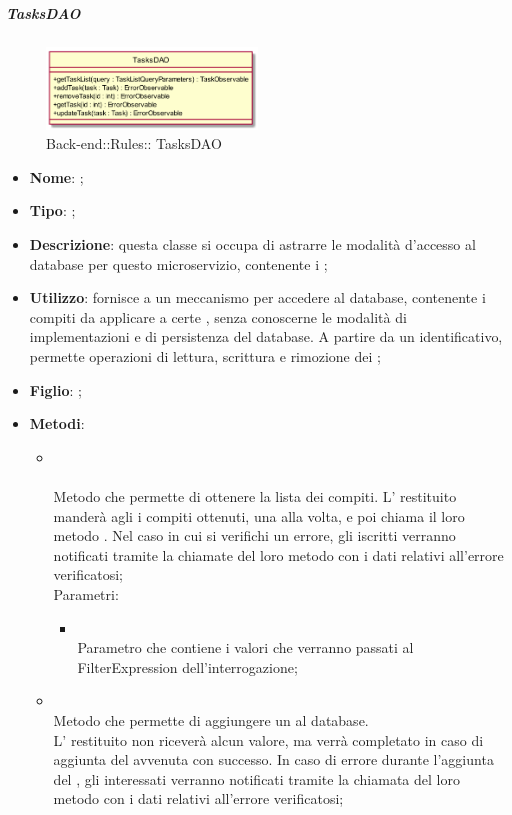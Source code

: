 \hypertarget{ TasksDAO_label}{\subparagraph{ TasksDAO}}
\begin{figure}[h]
	\centering
	\includegraphics[width=0.50\textwidth,height=\textheight,keepaspectratio]{images/ClassTasksDAO.png}
	\caption{Back-end::Rules:: TasksDAO}
\end{figure}
\begin{itemize}
	\item \textbf{Nome}: ;
	\item \textbf{Tipo}: ;
	\item \textbf{Descrizione}: questa classe si occupa di astrarre le modalità d'accesso al database per questo microservizio, contenente i ;
	\item \textbf{Utilizzo}: fornisce a  un meccanismo per accedere al database, contenente i compiti da applicare a certe , senza conoscerne le modalità di implementazioni e di persistenza del database. A partire da un identificativo, permette operazioni di lettura, scrittura e rimozione dei ;
	\item \textbf{Figlio}: ;
	\item \textbf{Metodi}:
	\begin{itemize}
		\item[]  \\\\		Metodo che permette di ottenere la lista dei compiti. L' restituito manderà agli  i compiti ottenuti, una alla volta, e poi chiama il loro metodo . Nel caso in cui si verifichi un errore, gli  iscritti verranno notificati tramite la chiamate del loro metodo  con i dati relativi all'errore verificatosi;\\
		Parametri:
		\begin{itemize}
			\item {} \\
			Parametro che contiene i valori che verranno passati al FilterExpression dell'interrogazione;
		\end{itemize}
		\item[]  \\		Metodo che permette di aggiungere un  al database. \\ L' restituito non riceverà alcun valore, ma verrà completato in caso di aggiunta del  avvenuta con successo. In caso di errore durante l'aggiunta del , gli  interessati verranno notificati tramite la chiamata del loro metodo  con i dati relativi all'errore verificatosi;\\

\end{itemize}
\end{itemize}

